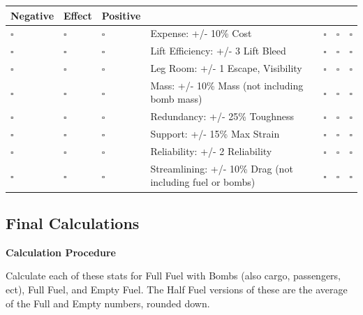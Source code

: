 \documentclass{article}
\begin{document}
\begin{tabular}{|l|l|l|l|l|l|l|}
    \hline
    Negative    & \textbf{Effect} & Positive    &                                                           &             &             &             \\\hline
    $ \square $ & $ \square $     & $ \square $ & Expense: +/- 10\% Cost                                    & $ \square $ & $ \square $ & $ \square $ \\\hline
    $ \square $ & $ \square $     & $ \square $ & Lift Efficiency: +/- 3 Lift Bleed                         & $ \square $ & $ \square $ & $ \square $ \\\hline
    $ \square $ & $ \square $     & $ \square $ & Leg Room: +/- 1 Escape, Visibility                        & $ \square $ & $ \square $ & $ \square $ \\\hline
    $ \square $ & $ \square $     & $ \square $ & Mass: +/- 10\% Mass (not including bomb mass)             & $ \square $ & $ \square $ & $ \square $ \\\hline
    $ \square $ & $ \square $     & $ \square $ & Redundancy: +/- 25\% Toughness                            & $ \square $ & $ \square $ & $ \square $ \\\hline
    $ \square $ & $ \square $     & $ \square $ & Support: +/- 15\% Max Strain                              & $ \square $ & $ \square $ & $ \square $ \\\hline

    $ \square $ & $ \square $     & $ \square $ & Reliability: +/- 2 Reliability                            & $ \square $ & $ \square $ & $ \square $ \\\hline
    $ \square $ & $ \square $     & $ \square $ & Streamlining: +/- 10\% Drag (not including fuel or bombs) &
    $ \square $ & $ \square $     & $ \square $                                                                                                       \\\hline
\end{tabular}

\subsection{Final Calculations}
\label{_Final_Calculations}

\textbf{Calculation Procedure}

Calculate each of these stats for Full Fuel with Bombs (also cargo,
passengers, ect), Full Fuel, and Empty Fuel. The Half Fuel versions of
these are the average of the Full and Empty numbers, rounded down.
\end{document}
